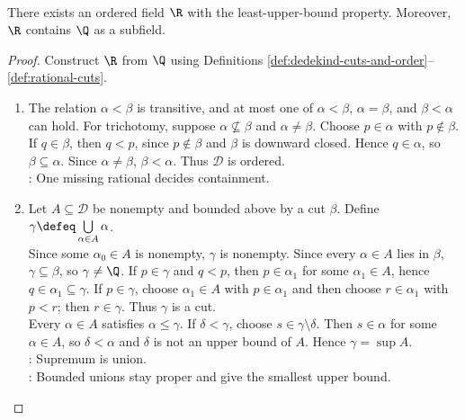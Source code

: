 \begin{theorem} \label{thm:real-field-existence-lub} \\
There exists an ordered field $\R$ with the least-upper-bound property. Moreover, $\R$ contains $\Q$ as a subfield.
\begin{proof}
Construct $\R$ from $\Q$ using Definitions \ref{def:dedekind-cuts-and-order}--\ref{def:rational-cuts}.
\begin{enumerate}[label=(\roman*)]
\setlength{\itemsep}{0pt}
\item {}
The relation $\alpha<\beta$ is transitive, and at most one of $\alpha<\beta$, $\alpha=\beta$, and $\beta<\alpha$ can hold. For trichotomy, suppose $\alpha\not\subseteq\beta$ and $\alpha\neq\beta$. Choose $p\in\alpha$ with $p\notin\beta$. If $q\in\beta$, then $q<p$, since $p\notin\beta$ and $\beta$ is downward closed. Hence $q\in\alpha$, so $\beta\subseteq\alpha$. Since $\alpha\neq\beta$, $\beta<\alpha$. Thus $\mathscr{D}$ is ordered.\\
: One missing rational decides containment.

\item {}
Let $A\subseteq\mathscr{D}$ be nonempty and bounded above by a cut $\beta$. Define $\gamma\defeq\bigcup\limits_{\alpha\in A}\alpha$.\\
Since some $\alpha_0\in A$ is nonempty, $\gamma$ is nonempty. Since every $\alpha\in A$ lies in $\beta$, $\gamma\subseteq\beta$, so $\gamma\neq\Q$. If $p\in\gamma$ and $q<p$, then $p\in\alpha_1$ for some $\alpha_1\in A$, hence $q\in\alpha_1\subseteq\gamma$. If $p\in\gamma$, choose $\alpha_1\in A$ with $p\in\alpha_1$ and then choose $r\in\alpha_1$ with $p<r$; then $r\in\gamma$. Thus $\gamma$ is a cut.\\
Every $\alpha\in A$ satisfies $\alpha\leq\gamma$. If $\delta<\gamma$, choose $s\in\gamma\setminus\delta$. Then $s\in\alpha$ for some $\alpha\in A$, so $\delta<\alpha$ and $\delta$ is not an upper bound of $A$. Hence $\gamma=\sup A$.\\
: Supremum is union.\\
: Bounded unions stay proper and give the smallest upper bound.


\end{enumerate}
\end{proof}
\end{theorem}
